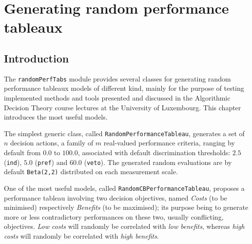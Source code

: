 \chapter{Generating random performance tableaux}
\label{sec:6}



\section{Introduction}
\label{sec:6.1}

The \texttt{randomPerfTabs} module provides several classes for generating random performance tableaux models of different kind, mainly for the purpose of testing implemented methods and tools presented and discussed in the Algorithmic Decision Theory course lectures at the University of Luxembourg. This chapter introduces the most useful models.

The simplest generic class, called \texttt{RandomPerformanceTableau}, generates a set of $n$ decision actions, a family of $m$ real-valued performance criteria, ranging by default from $0.0$ to $100.0$, associated with default discrimination thresholds: $2.5$ (\texttt{ind}), $5.0$ (\texttt{pref}) and $60.0$ (\texttt{veto}). The generated random evaluations are by default \texttt{Beta(2,2)} distributed on each measurement scale.

One of the most useful models, called \texttt{RandomCBPerformanceTableau}\index{}, proposes a performance tableau involving two decision objectives, named \emph{Costs} (to be minimised) respectively \emph{Benefits} (to be maximised); its purpose being to generate more or less contradictory performances on these two, usually conflicting, objectives. \emph{Low costs} will randomly be correlated with \emph{low benefits}, whereas \emph{high costs} will randomly be correlated with \emph{high benefits}.


